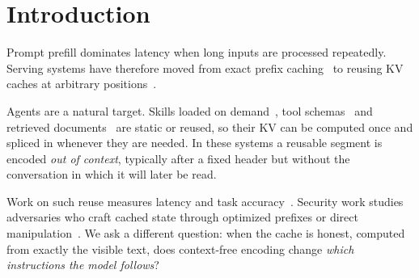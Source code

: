 \documentclass[10pt]{article}
\begin{document}
\section{Introduction}
Prompt prefill dominates latency when long inputs are processed repeatedly. Serving systems have therefore moved from exact
prefix caching~\citep{gim2024promptcache,zheng2024sglang} to reusing KV caches at arbitrary
positions~\citep{yao2025cacheblend,hu2024epic,chen2026kvpacket,li2026notes,liu2025lmcache}.

Agents are a natural target. Skills loaded on demand~\citep{zhang2026progressive,nakasuji2026skillblocks}, tool
schemas~\citep{fang2026recache} and retrieved documents~\citep{lu2024turborag,yao2025cacheblend} are static or reused, so their
KV can be computed once and spliced in whenever they are needed. In these systems a reusable segment is encoded \emph{out of
context}, typically after a fixed header but without the conversation in which it will later be read.

Work on such reuse measures latency and task accuracy~\citep{cestola2026evaluating,rakotonirina2026where}. Security work studies
adversaries who craft cached state through optimized prefixes or direct
manipulation~\citep{zhang2026hijackkv,zhu2026r2ecap,ganesh2025narrative}. We ask a different question: when the cache is honest,
computed from exactly the visible text, does context-free encoding change \emph{which instructions the model follows}?
\end{document}
